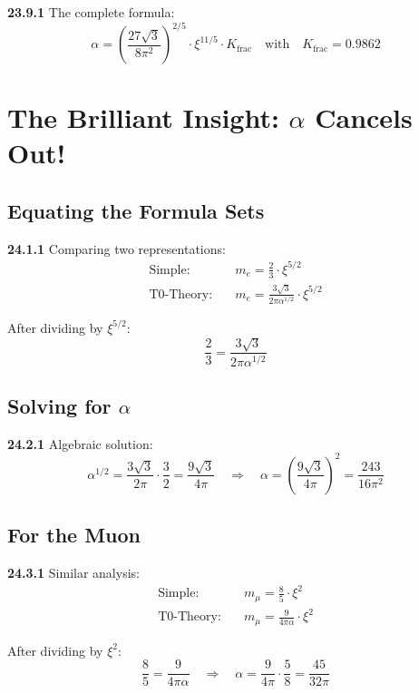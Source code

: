 \documentclass[12pt,a4paper]{article}
\begin{document}
\noindent \textbf{23.9.1} The complete formula:
\[
\boxed{
	\alpha = \left(\frac{27\sqrt{3}}{8\pi^2}\right)^{2/5} \cdot \xi^{11/5} \cdot K_{\text{frac}}
}
\quad \text{with} \quad K_{\text{frac}} = 0.9862
\]	


\section{The Brilliant Insight: $\alpha$ Cancels Out!}

\subsection{Equating the Formula Sets}

\noindent \textbf{24.1.1} Comparing two representations:
\begin{align*}
	\text{Simple:} &\quad m_e = \frac{2}{3} \cdot \xi^{5/2} \\
	\text{T0-Theory:} &\quad m_e = \frac{3\sqrt{3}}{2\pi\alpha^{1/2}} \cdot \xi^{5/2}
\end{align*}

After dividing by $\xi^{5/2}$:
\[
\frac{2}{3} = \frac{3\sqrt{3}}{2\pi\alpha^{1/2}}
\]

\subsection{Solving for $\alpha$}

\noindent \textbf{24.2.1} Algebraic solution:
\[
\alpha^{1/2} = \frac{3\sqrt{3}}{2\pi} \cdot \frac{3}{2} = \frac{9\sqrt{3}}{4\pi}
\quad \Rightarrow \quad
\alpha = \left(\frac{9\sqrt{3}}{4\pi}\right)^2 = \frac{243}{16\pi^2}
\]

\subsection{For the Muon}

\noindent \textbf{24.3.1} Similar analysis:
\begin{align*}
	\text{Simple:} &\quad m_\mu = \frac{8}{5} \cdot \xi^2 \\
	\text{T0-Theory:} &\quad m_\mu = \frac{9}{4\pi\alpha} \cdot \xi^2
\end{align*}

After dividing by $\xi^2$:
\[
\frac{8}{5} = \frac{9}{4\pi\alpha}
\quad \Rightarrow \quad
\alpha = \frac{9}{4\pi} \cdot \frac{5}{8} = \frac{45}{32\pi}
\]
\end{document}
